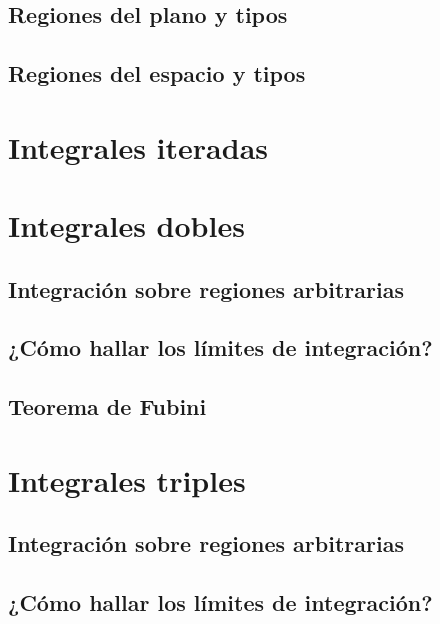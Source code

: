 \documentclass[12pt, fleqn]{report}                             %
\begin{document}
            \subsection{Regiones del plano y tipos}
            
            \subsection{Regiones del espacio y tipos}
        
        \section{Integrales iteradas}
        
        \section{Integrales dobles}
            
            \subsection{Integración sobre regiones arbitrarias}
            
            \subsection{¿Cómo hallar los límites de integración?}
            
            \subsection{Teorema de Fubini}
        
        \section{Integrales triples}
            
            \subsection{Integración sobre regiones arbitrarias}
            
            \subsection{¿Cómo hallar los límites de integración?}
            
\end{document}
